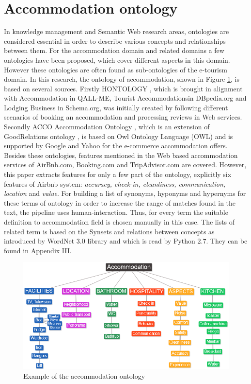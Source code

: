 \section{Accommodation ontology} 
In knowledge management and Semantic Web research areas, ontologies are considered essential in order to describe various concepts and relationships between them. For the accommodation domain and related domains a few ontologies have been proposed, which cover different aspects in this domain. However these ontologies are often found as sub-ontologies of the e-tourism domain. In this research, the ontology of accommodation, shown in Figure \ref{fig:onto}, is based on several sources. Firstly HONTOLOGY \cite{chaves2012hontology}, which is brought in alignment with Accommodation in QALL-ME, Tourist Accommodationsin DBpedia.org and Lodging Business  in Schema.org, was initially created by following different scenarios of booking an accommodation and processing reviews in Web services. Secondly ACCO Accommodation Ontology \cite{hepp2013accommodation}, which is an extension of GoodRelations ontology \cite{hepp2008goodrelations}, is based on Owl Ontology Language (OWL) and is supported by Google and Yahoo for the e-commerce accommodation offers.
Besides these ontologies, features mentioned in the Web based accommodation services of AirBnb.com, Booking.com and TripAdvisor.com are covered. However, this paper extracts features for only a few part of the ontology, explicitly six features of Airbnb system: \textit{accuracy, check-in, cleanliness, communication, location} and \textit{value}.
For building a list of synonyms, hyponyms and hypernyms for these terms of ontology in order to increase the range of matches found in the text, the pipeline uses human-interaction. Thus, for every term the suitable definition to accommodation field is chosen manually in this case. The lists of related term is based on the Synsets and relations between concepts as introduced by WordNet 3.0 library and which is read by Python 2.7. They can be found in Appendix III.
\begin{figure}[h!]
	\centering
	\includegraphics[height=0.3\textheight]{Ontology_of_accommodation}
	\caption{Example of the accommodation ontology}
	\label{fig:onto}
\end{figure}